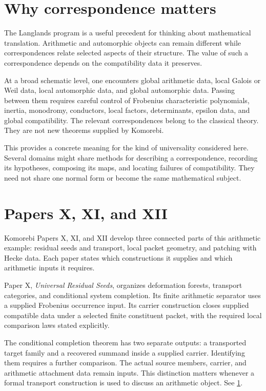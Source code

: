\documentclass[11pt,oneside,openany]{book}
\begin{document}
\section{Why correspondence matters}
The Langlands program is a useful precedent for thinking about mathematical translation. Arithmetic and automorphic objects can remain different while correspondences relate selected aspects of their structure. The value of such a correspondence depends on the compatibility data it preserves.

At a broad schematic level, one encounters global arithmetic data, local Galois or Weil data, local automorphic data, and global automorphic data. Passing between them requires careful control of Frobenius characteristic polynomials, inertia, monodromy, conductors, local factors, determinants, epsilon data, and global compatibility. The relevant correspondences belong to the classical theory. They are not new theorems supplied by Komorebi.

This provides a concrete meaning for the kind of universality considered here. Several domains might share methods for describing a correspondence, recording its hypotheses, composing its maps, and locating failures of compatibility. They need not share one normal form or become the same mathematical subject.

\section{Papers X, XI, and XII}
Komorebi Papers X, XI, and XII develop three connected parts of this arithmetic example: residual seeds and transport, local packet geometry, and patching with Hecke data. Each paper states which constructions it supplies and which arithmetic inputs it requires.

Paper X, \emph{Universal Residual Seeds}, organizes deformation forests, transport categories, and conditional system completion. Its finite arithmetic separator uses a supplied Frobenius occurrence input. Its carrier construction closes supplied compatible data under a selected finite constituent packet, with the required local comparison laws stated explicitly.

The conditional completion theorem has two separate outputs: a transported target family and a recovered summand inside a supplied carrier. Identifying them requires a further comparison. The actual source members, carrier, and arithmetic attachment data remain inputs. This distinction matters whenever a formal transport construction is used to discuss an arithmetic object. See \hyperlink{reference-1}{1}.
\end{document}

